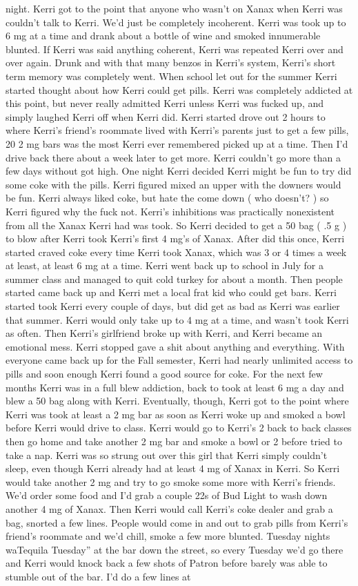 \documentclass[12pt]{book}
\begin{document}
night. Kerri got to the point that anyone who wasn't on Xanax when Kerri was couldn't talk to Kerri. We'd just be completely incoherent. Kerri was took up to 6 mg at a time and drank about a bottle of wine and smoked innumerable blunted. If Kerri was said anything coherent, Kerri was repeated Kerri over and over again. Drunk and with that many benzos in Kerri's system, Kerri's short term memory was completely went. When school let out for the summer Kerri started thought about how Kerri could get pills. Kerri was completely addicted at this point, but never really admitted Kerri unless Kerri was fucked up, and simply laughed Kerri off when Kerri did. Kerri started drove out 2 hours to where Kerri's friend's roommate lived with Kerri's parents just to get a few pills, 20 2 mg bars was the most Kerri ever remembered picked up at a time. Then I'd drive back there about a week later to get more. Kerri couldn't go more than a few days without got high. One night Kerri decided Kerri might be fun to try did some coke with the pills. Kerri figured mixed an upper with the downers would be fun. Kerri always liked coke, but hate the come down ( who doesn't? ) so Kerri figured why the fuck not. Kerri's inhibitions was practically nonexistent from all the Xanax Kerri had was took. So Kerri decided to get a 50 bag ( .5 g ) to blow after Kerri took Kerri's first 4 mg's of Xanax. After did this once, Kerri started craved coke every time Kerri took Xanax, which was 3 or 4 times a week at least, at least 6 mg at a time. Kerri went back up to school in July for a summer class and managed to quit cold turkey for about a month. Then people started came back up and Kerri met a local frat kid who could get bars. Kerri started took Kerri every couple of days, but did get as bad as Kerri was earlier that summer. Kerri would only take up to 4 mg at a time, and wasn't took Kerri as often. Then Kerri's girlfriend broke up with Kerri, and Kerri became an emotional mess. Kerri stopped gave a shit about anything and everything. With everyone came back up for the Fall semester, Kerri had nearly unlimited access to pills and soon enough Kerri found a good source for coke. For the next few months Kerri was in a full blew addiction, back to took at least 6 mg a day and blew a 50 bag along with Kerri. Eventually, though, Kerri got to the point where Kerri was took at least a 2 mg bar as soon as Kerri woke up and smoked a bowl before Kerri would drive to class. Kerri would go to Kerri's 2 back to back classes then go home and take another 2 mg bar and smoke a bowl or 2 before tried to take a nap. Kerri was so strung out over this girl that Kerri simply couldn't sleep, even though Kerri already had at least 4 mg of Xanax in Kerri. So Kerri would take another 2 mg and try to go smoke some more with Kerri's friends. We'd order some food and I'd grab a couple 22s of Bud Light to wash down another 4 mg of Xanax. Then Kerri would call Kerri's coke dealer and grab a bag, snorted a few lines. People would come in and out to grab pills from Kerri's friend's roommate and we'd chill, smoke a few more blunted. Tuesday nights waTequila Tuesday'' at the bar down the street, so every Tuesday we'd go there and Kerri would knock back a few shots of Patron before barely was able to stumble out of the bar. I'd do a few lines at 
\end{document}
